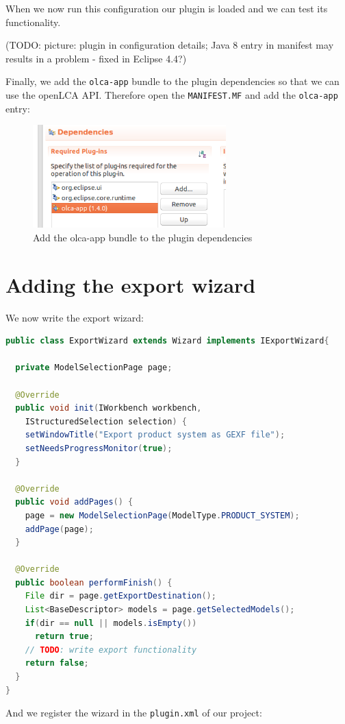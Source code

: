 \documentclass{scrreprt}
\begin{document}
When we now run this configuration our plugin is loaded and we can test its functionality. 

(TODO: picture: plugin in configuration details; Java 8 entry in manifest may results in a problem - fixed in Eclipse 4.4?)

Finally, we add the \texttt{olca-app} bundle to the plugin dependencies so that we can use the openLCA API. Therefore open the \texttt{MANIFEST.MF} and add the \texttt{olca-app} entry:

\begin{figure}[H]
\centering
\includegraphics[height=150px]{images/plugin_add_app_dependency.png}
\caption{Add the olca-app bundle to the plugin dependencies}
\end{figure}  

\section{Adding the export wizard}
We now write the export wizard:

\begin{lstlisting}[language=Java]
public class ExportWizard extends Wizard implements IExportWizard{
  
  private ModelSelectionPage page;
	
  @Override
  public void init(IWorkbench workbench, 
    IStructuredSelection selection) {
    setWindowTitle("Export product system as GEXF file");
    setNeedsProgressMonitor(true);
  }

  @Override
  public void addPages() {
    page = new ModelSelectionPage(ModelType.PRODUCT_SYSTEM);
    addPage(page);
  }
	
  @Override
  public boolean performFinish() {
    File dir = page.getExportDestination();
    List<BaseDescriptor> models = page.getSelectedModels();
    if(dir == null || models.isEmpty())
      return true;
    // TODO: write export functionality
    return false;
  }
}
\end{lstlisting}

And we register the wizard in the \texttt{plugin.xml} of our project:
\end{document}
